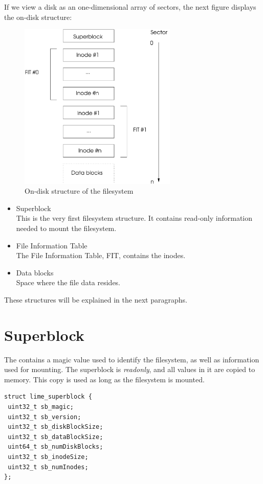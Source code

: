 If we view a disk as an one-dimensional array of sectors, the next figure displays the on-disk structure:

\begin{figure}[h]
\includegraphics[height=8cm]{disk-layout}
\caption{On-disk structure of the filesystem}
\end{figure}

\begin{itemize}
\item Superblock \\
This is the very first filesystem structure. It contains read-only information needed to mount the filesystem.
\item File Information Table \\
The File Information Table, FIT, contains the inodes.
\item Data blocks \\
Space where the file data resides.
\end{itemize}

These structures will be explained in the next paragraphs.

\section{Superblock}
\label{superblock}

The  contains a magic value used to identify the filesystem, as well as information used for mounting. The superblock is \emph{readonly}, and all values in it are copied to memory. This copy is used as long as the filesystem is mounted.

\begin{verbatim}
struct lime_superblock {
 uint32_t sb_magic;
 uint32_t sb_version;
 uint32_t sb_diskBlockSize;
 uint32_t sb_dataBlockSize;
 uint64_t sb_numDiskBlocks;
 uint32_t sb_inodeSize;
 uint32_t sb_numInodes;
};
\end{verbatim}

